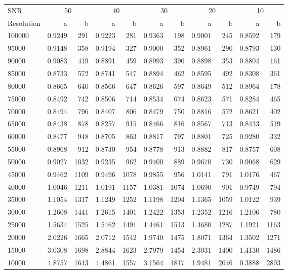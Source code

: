 \documentclass[referee]{aa}
\begin{document}
\begin{table}[]
\begin{center}
{{\begin{tabular}{l r r r r r r r r r r}
\hline
SNR & \multicolumn{2}{c|}{50} & \multicolumn{2}{c|}{40} & \multicolumn{2}{c|}{30} & \multicolumn{2}{c|}{20} & \multicolumn{2}{c}{10} \\
Resolution & a & b & a & b & a & b & a & b & a & b  \\
\hline
100000 & 0.9249 & 291 & 0.9223 & 281 & 0.9363 & 198 & 0.9001 & 245 & 0.8592 & 179 \\
95000 & 0.9148 & 358 & 0.9194 & 327 & 0.9000 & 352 & 0.8961 & 290 & 0.8793 & 130 \\
90000 & 0.9083 & 419 & 0.8891 & 459 & 0.8993 & 390 & 0.8898 & 353 & 0.8804 & 161 \\
85000 & 0.8733 & 572 & 0.8741 & 547 & 0.8894 & 462 & 0.8595 & 492 & 0.8308 & 361 \\
80000 & 0.8665 & 640 & 0.8566 & 647 & 0.8626 & 597 & 0.8649 & 512 & 0.8964 & 178 \\
75000 & 0.8492 & 742 & 0.8506 & 714 & 0.8534 & 674 & 0.8623 & 571 & 0.8284 & 465 \\
70000 & 0.8494 & 796 & 0.8407 & 806 & 0.8479 & 750 & 0.8816 & 572 & 0.8621 & 402 \\
65000 & 0.8438 & 878 & 0.8257 & 915 & 0.8466 & 816 & 0.8567 & 713 & 0.8433 & 519 \\
60000 & 0.8477 & 948 & 0.8705 & 863 & 0.8817 & 797 & 0.8801 & 725 & 0.9280 & 332 \\
55000 & 0.8968 & 912 & 0.8730 & 954 & 0.8778 & 913 & 0.8882 & 817 & 0.8757 & 608 \\
50000 & 0.9027 & 1032 & 0.9235 & 962 & 0.9400 & 889 & 0.9670 & 730 & 0.9068 & 629 \\
45000 & 0.9462 & 1109 & 0.9496 & 1078 & 0.9855 & 956 & 1.0141 & 791 & 1.0176 & 467 \\
40000 & 1.0046 & 1211 & 1.0191 & 1157 & 1.0381 & 1074 & 1.0690 & 901 & 0.9749 & 794 \\
35000 & 1.1054 & 1317 & 1.1249 & 1252 & 1.1198 & 1204 & 1.1365 & 1059 & 1.0122 & 939 \\
30000 & 1.2608 & 1441 & 1.2615 & 1401 & 1.2422 & 1353 & 1.2352 & 1216 & 1.2106 & 780 \\
25000 & 1.5634 & 1525 & 1.5462 & 1491 & 1.4461 & 1513 & 1.4680 & 1287 & 1.1921 & 1163 \\
20000 & 2.0226 & 1665 & 2.0712 & 1542 & 1.9740 & 1475 & 1.8071 & 1364 & 1.3502 & 1271 \\
15000 & 3.0308 & 1698 & 2.8844 & 1623 & 2.7979 & 1454 & 2.3031 & 1400 & 1.4130 & 1486 \\
10000 & 4.8757 & 1643 & 4.4861 & 1557 & 3.1564 & 1817 & 1.9481 & 2046 & 0.3888 & 2893 \\
\hline

\end{tabular}
}}
\end{center}
\end{table}
\end{document}
